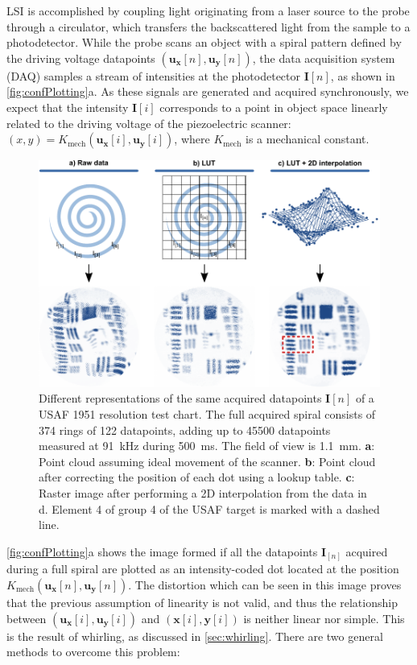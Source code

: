 \documentclass[10pt]{iopart}
\begin{document}
LSI is accomplished by coupling light originating from a laser source to the probe through a circulator, which transfers the backscattered light from the sample to a photodetector. While the probe scans an object with a spiral pattern defined by the driving voltage datapoints $(\mathbf{u_x}[n], \mathbf{u_y}[n])$, the data acquisition system (DAQ) samples a stream of intensities at the photodetector $\mathbf{I}[n]$, as shown in \autoref{fig:confPlotting}a. As these signals are generated and acquired synchronously, we expect that the intensity $\mathbf{I}[i]$ corresponds to a point in object space linearly related to the driving voltage of the piezoelectric scanner: $(x, y) = K_\mathrm{mech}(\mathbf{u_x}[i], \mathbf{u_y}[i])$, where $K_\mathrm{mech}$ is a mechanical constant.

\begin{figure}[h!]\centering \includegraphics[width=\columnwidth]{figures/PlottingMark.pdf}
      \caption{Different representations of the same acquired datapoints $\mathbf{I}[n]$ of a USAF 1951 resolution test chart. The full acquired spiral consists of 374 rings of 122 datapoints, adding up to 45500 datapoints measured at \SI{91}{\kilo\hertz} during \SI{500}{\milli\second}. The field of view is \SI{1.1}{\milli\meter}.
      \textbf{a}: Point cloud assuming ideal movement of the scanner.
      \textbf{b}: Point cloud after correcting the position of each dot using a lookup table.
      \textbf{c}: Raster image after performing a 2D interpolation from the data in d. Element 4 of group 4 of the USAF target is marked with a dashed line.}
      \label{fig:confPlotting}
\end{figure}


\autoref{fig:confPlotting}a shows the image formed if all the datapoints $\mathbf{I}_{[n]}$ acquired during a full spiral are plotted as an intensity-coded dot located at the position $K_\mathrm{mech}(\mathbf{u_x}[n], \mathbf{u_y}[n])$. The distortion which can be seen in this image proves that the previous assumption of linearity is not valid, and thus the relationship between $(\mathbf{u_x}[i], \mathbf{u_y}[i])$ and $(\mathbf{x}[i], \mathbf{y}[i])$ is neither linear nor simple. This is the result of whirling, as discussed in \autoref{sec:whirling}. There are two general methods to overcome this problem:
\end{document}
